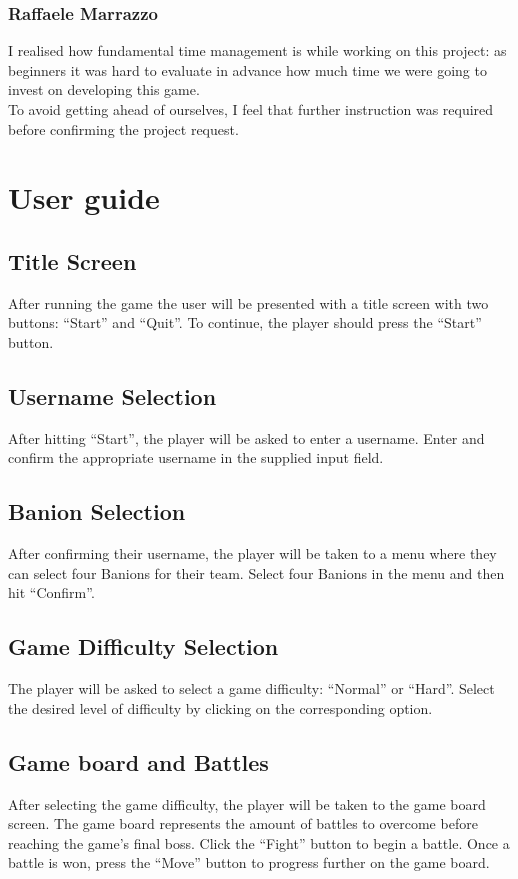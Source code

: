 \documentclass[12pt, a4paper]{report}
\theoremstyle{definition}
\begin{document}
    \subsection*{Raffaele Marrazzo}

    I realised how fundamental time management is while working on this project: as beginners it was hard to evaluate in advance how much time we
    were going to invest on developing this game.\\
    To avoid getting ahead of ourselves, I feel that further instruction was required before confirming the project request.

\appendix

\chapter{User guide}

\section{Title Screen}
After running the game the user will be presented with a title screen with two buttons: ``Start'' and ``Quit''. To continue, the player should press the ``Start'' button.

\section{Username Selection}
After hitting ``Start'', the player will be asked to enter a username. Enter and confirm the appropriate username in the supplied input field.

\section{Banion Selection}
After confirming their username, the player will be taken to a menu where they can select four Banions for their team.
Select four Banions in the menu and then hit ``Confirm''.

\section{Game Difficulty Selection}
The player will be asked to select a game difficulty: ``Normal'' or ``Hard''. Select the desired level of difficulty by clicking on the corresponding option.

\section{Game board and Battles}
After selecting the game difficulty, the player will be taken to the game board screen. The game board represents the amount of battles to overcome before reaching the game's final boss.
Click the ``Fight'' button to begin a battle. Once a battle is won, press the ``Move'' button to progress further on the game board.
\end{document}
